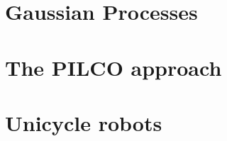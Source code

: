 \documentclass[main.tex]{subfiles}
\begin{document}
\section{Gaussian Processes}

\section{The PILCO approach}

\section{Unicycle robots}
\end{document}
